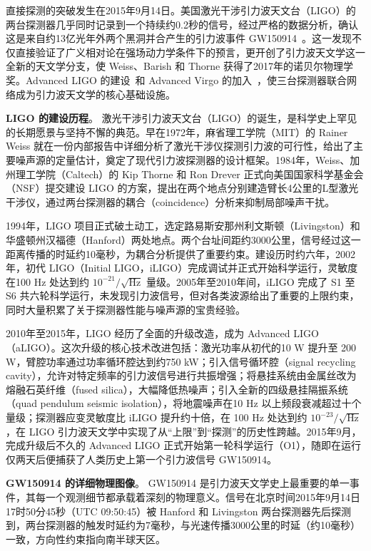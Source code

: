 直接探测的突破发生在2015年9月14日。美国激光干涉引力波天文台（LIGO）的两台探测器几乎同时记录到一个持续约0.2秒的信号，经过严格的数据分析，确认这是来自约13亿光年外两个黑洞并合产生的引力波事件 GW150914~\cite{Abbott2016GW150914}。这一发现不仅直接验证了广义相对论在强场动力学条件下的预言，更开创了引力波天文学这一全新的天文学分支，使 Weiss、Barish 和 Thorne 获得了2017年的诺贝尔物理学奖。Advanced LIGO 的建设~\cite{LIGOScientific2015detector}和 Advanced Virgo 的加入~\cite{Acernese2015Virgo}，使三台探测器联合网络成为引力波天文学的核心基础设施。

\textbf{LIGO 的建设历程}。
激光干涉引力波天文台（LIGO）的诞生，是科学史上罕见的长期愿景与坚持不懈的典范。早在1972年，麻省理工学院（MIT）的 Rainer Weiss 就在一份内部报告中详细分析了激光干涉仪探测引力波的可行性，给出了主要噪声源的定量估计，奠定了现代引力波探测器的设计框架。1984年，Weiss、加州理工学院（Caltech）的 Kip Thorne 和 Ron Drever 正式向美国国家科学基金会（NSF）提交建设 LIGO 的方案，提出在两个地点分别建造臂长4公里的L型激光干涉仪，通过两台探测器的耦合（coincidence）分析来抑制局部噪声干扰。

1994年，LIGO 项目正式破土动工，选定路易斯安那州利文斯顿（Livingston）和华盛顿州汉福德（Hanford）两处地点。两个台址间距约3000公里，信号经过这一距离传播的时延约10毫秒，为耦合分析提供了重要约束。建设历时约六年，2002年，初代 LIGO（Initial LIGO，iLIGO）完成调试并正式开始科学运行，灵敏度在100 Hz 处达到约 $10^{-21}/\sqrt{\text{Hz}}$ 量级。2005年至2010年间，iLIGO 完成了 S1 至 S6 共六轮科学运行，未发现引力波信号，但对各类波源给出了重要的上限约束，同时大量积累了关于探测器性能与噪声源的宝贵经验。

2010年至2015年，LIGO 经历了全面的升级改造，成为 Advanced LIGO（aLIGO）。这次升级的核心技术改进包括：激光功率从初代的10 W 提升至 200 W，臂腔功率通过功率循环腔达到约750 kW；引入信号循环腔（signal recycling cavity），允许对特定频率的引力波信号进行共振增强；将悬挂系统由金属丝改为熔融石英纤维（fused silica），大幅降低热噪声；引入全新的四级悬挂隔振系统（quad pendulum seismic isolation），将地震噪声在10 Hz 以上频段衰减超过十个量级；探测器应变灵敏度比 iLIGO 提升约十倍，在 100 Hz 处达到约 $10^{-23}/\sqrt{\text{Hz}}$，在 LIGO 引力波天文学中实现了从“上限”到“探测”的历史性跨越。2015年9月，完成升级后不久的 Advanced LIGO 正式开始第一轮科学运行（O1），随即在运行仅两天后便捕获了人类历史上第一个引力波信号 GW150914。

\textbf{GW150914 的详细物理图像}。
GW150914 是引力波天文学史上最重要的单一事件，其每一个观测细节都承载着深刻的物理意义。信号在北京时间2015年9月14日17时50分45秒（UTC 09:50:45）被 Hanford 和 Livingston 两台探测器先后探测到，两台探测器的触发时延约为7毫秒，与光速传播3000公里的时延（约10毫秒）一致，方向性约束指向南半球天区。

